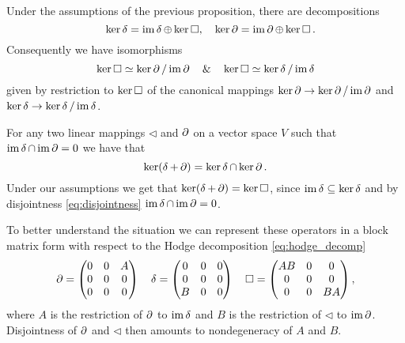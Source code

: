 \documentclass[12pt,a4paper,final]{report}
\begin{document}
\begin{corollary}
 Under the assumptions of the previous proposition, there are decompositions
  \begin{equation}
    \quad \ker \lhd = \im \lhd \oplus \ker \lap, \quad \ker \lcd = \im\lcd\oplus\ker\lap.
  \end{equation}
  Consequently we have isomorphisms
  \begin{equation}\label{eq:kerlap_iso}
    \ker \lap \simeq \ker \lcd /\im \lcd \quad\&\quad \ker \lap \simeq \ker \lhd / \im \lhd
  \end{equation}
  given by restriction to $\ker \lap$ of the canonical mappings $\ker \lcd \to \ker \lcd / \im \lcd$ and $\ker \lhd \to \ker \lhd / \im \lhd$.
\end{corollary}

\begin{remark}
 For any two linear mappings $\lhd$ and $\lcd$ on a vector space $V$ such that $\im\lhd\cap\im\lcd = 0$ we have that \[ \ker (\lhd + \lcd)  = \ker \lhd \cap \ker \lcd.\] Under our assumptions we get that $\ker (\lhd +\lcd) = \ker \lap$, since $\im \lhd \subseteq \ker \lhd$ and by disjointness \eqref{eq:disjointness} $\im \lhd \cap \im \lcd = 0$.
\end{remark}


To better understand the situation we can represent these operators in a block matrix form with respect to the Hodge decomposition \eqref{eq:hodge_decomp}
\[
 \lcd = \begin{pmatrix} 0 & 0 & A\\0&0&0\\0&0&0\end{pmatrix} \quad \lhd = \begin{pmatrix} 0 & 0 &0\\0&0&0\\ B&0&0\end{pmatrix} \quad
 \lap = \begin{pmatrix}
	  AB & 0 & 0 \\
	  0 & 0 & 0 \\
	  0 & 0 & BA
	\end{pmatrix},
\]
where $A$ is the restriction of $\lcd$ to $\im\lhd$ and $B$ is the restriction of $\lhd$ to $\im \lcd$. Disjointness of $\lcd$ and $\lhd$ then amounts to nondegeneracy of $A$ and $B$.
\end{document}
